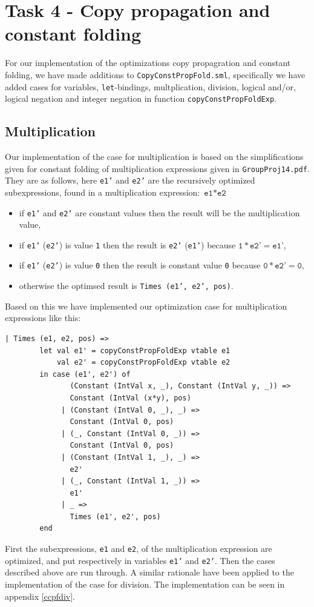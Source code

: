 \documentclass[11pt]{article}
\begin{document}
    \section{Task 4 - Copy propagation and constant folding}
	For our implementation of the optimizations copy propagration and constant
	folding, we have made additions to \texttt{CopyConstPropFold.sml}, specifically
	we have added cases for variables, \texttt{let}-bindings, multplication,
	division, logical and/or, logical negation and integer negation in function
	\texttt{copyConstPropFoldExp}.
	\subsection{Multiplication}
	Our implementation of the case for multiplication is based on the simplifications
	given for constant folding of multiplication expressions given in \texttt{GroupProj14.pdf}.
	They are as follows, here \texttt{e1'} and \texttt{e2'} are the recursively optimized
	subexpressions, found in a multiplication expression: $ \texttt{e1} \ast \texttt{e2}$
	\begin{itemize}
	\item if \texttt{e1'} and \texttt{e2'} are constant values then the result will be the
			multiplication value,
	\item if \texttt{e1'} (\texttt{e2'}) is value \texttt{1} then the result is \texttt{e2'}
			(\texttt{e1'}) because $\texttt{1} \ast \texttt{e2'} = \texttt{e1'}$,
	\item if \texttt{e1'} (\texttt{e2'}) is value \texttt{0} then the result is constant value
			\texttt{0} because $\texttt{0} \ast \texttt{e2'} = \texttt{0}$,
	\item otherwise the optimsed result is  \texttt{Times (e1', e2', pos)}.
	\end{itemize}
	Based on this we have implemented our optimization case for multiplication expressions like this:
	\begin{lstlisting}[basicstyle=\small]
      | Times (e1, e2, pos) =>
        let val e1' = copyConstPropFoldExp vtable e1
            val e2' = copyConstPropFoldExp vtable e2
        in case (e1', e2') of
               (Constant (IntVal x, _), Constant (IntVal y, _)) =>
               Constant (IntVal (x*y), pos)
             | (Constant (IntVal 0, _), _) =>
               Constant (IntVal 0, pos)
             | (_, Constant (IntVal 0, _)) =>
               Constant (IntVal 0, pos)
             | (Constant (IntVal 1, _), _) =>
               e2'
             | (_, Constant (IntVal 1, _)) =>
               e1'
             | _ =>
               Times (e1', e2', pos)
        end
	\end{lstlisting}
	First the subexpressions, \texttt{e1} and \texttt{e2}, of the multiplication expression are
	optimized, and put respectively in variables \texttt{e1'} and \texttt{e2'}.
	Then the cases described above are run through. A similar rationale have been applied to the
	implementation of the case for division. The implementation can be seen in appendix \ref{ccpfdiv}.
\end{document}
